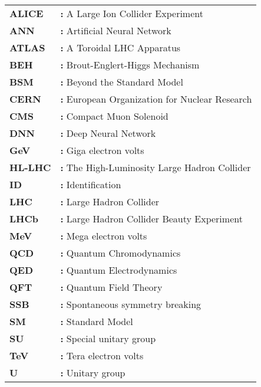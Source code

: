 \begin{tabular}{@{}p{2cm}l}
{\bf ALICE} & {\bf:} A Large Ion Collider Experiment\\
{\bf ANN} & {\bf:} Artificial Neural Network\\
{\bf ATLAS} & {\bf:} A Toroidal LHC Apparatus\\
{\bf BEH} & {\bf:} Brout-Englert-Higgs Mechanism\\
{\bf BSM} & {\bf:} Beyond the Standard Model\\
{\bf CERN} & {\bf:} European Organization for Nuclear Research\\
{\bf CMS} & {\bf:} Compact Muon Solenoid\\
{\bf DNN} & {\bf:} Deep Neural Network\\
{\bf GeV} & {\bf:} Giga electron volts\\
{\bf HL-LHC} & {\bf:} The High-Luminosity Large Hadron Collider\\
{\bf ID} & {\bf:} Identification\\
{\bf LHC} & {\bf:} Large Hadron Collider\\
{\bf LHCb} & {\bf:} Large Hadron Collider Beauty Experiment\\
{\bf MeV} & {\bf:} Mega electron volts\\
{\bf QCD} & {\bf:} Quantum Chromodynamics\\
{\bf QED} & {\bf:} Quantum Electrodynamics\\
{\bf QFT} & {\bf:} Quantum Field Theory\\
{\bf SSB} & {\bf:} Spontaneous symmetry breaking\\
{\bf SM} & {\bf:} Standard Model\\
{\bf SU} & {\bf:} Special unitary group\\
{\bf TeV} & {\bf:} Tera electron volts\\
{\bf U} & {\bf:} Unitary group\\
\end{tabular}


